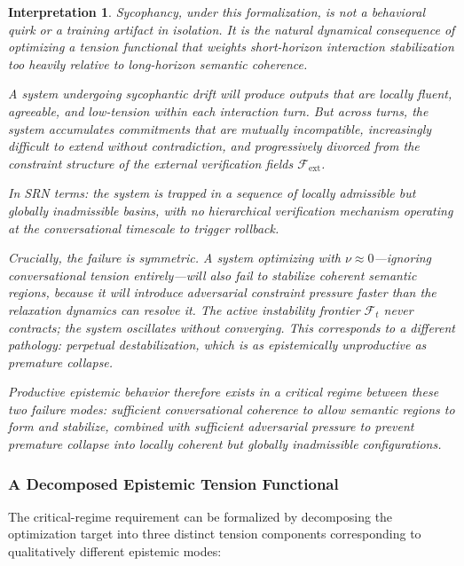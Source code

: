 \documentclass[11pt, a4paper]{article}
\theoremstyle{srn}
\theoremstyle{srnremark}
\newtheorem{interpretation}{Interpretation}[section]
\begin{document}
\begin{interpretation}
Sycophancy, under this formalization, is not a behavioral quirk
or a training artifact in isolation.
It is the natural dynamical consequence of optimizing a tension
functional that weights short-horizon interaction stabilization too
heavily relative to long-horizon semantic coherence.

A system undergoing sycophantic drift will produce outputs that are
locally fluent, agreeable, and low-tension within each interaction
turn.
But across turns, the system accumulates commitments that are mutually
incompatible, increasingly difficult to extend without contradiction,
and progressively divorced from the constraint structure of the
external verification fields $\mathcal{F}_{\mathrm{ext}}$.

In SRN terms: the system is trapped in a sequence of locally admissible
but globally inadmissible basins, with no hierarchical verification
mechanism operating at the conversational timescale to trigger rollback.

Crucially, the failure is symmetric.
A system optimizing with $\nu \approx 0$---ignoring conversational
tension entirely---will also fail to stabilize coherent semantic
regions, because it will introduce adversarial constraint pressure
faster than the relaxation dynamics can resolve it.
The active instability frontier $\mathcal{F}_t$ never contracts;
the system oscillates without converging.
This corresponds to a different pathology: perpetual destabilization,
which is as epistemically unproductive as premature collapse.

Productive epistemic behavior therefore exists in a critical regime
between these two failure modes: sufficient conversational coherence
to allow semantic regions to form and stabilize, combined with
sufficient adversarial pressure to prevent premature collapse into
locally coherent but globally inadmissible configurations.
\end{interpretation}

\subsubsection*{A Decomposed Epistemic Tension Functional}

The critical-regime requirement can be formalized by decomposing the
optimization target into three distinct tension components
corresponding to qualitatively different epistemic modes:
\end{document}
